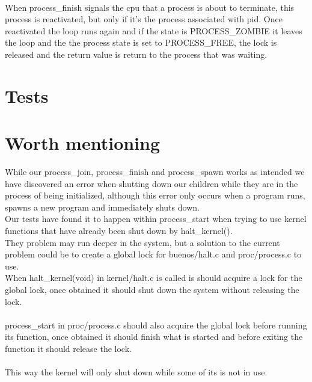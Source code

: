 \documentclass[a4paper,12pt,danish]{report}
\begin{document}
\begin{itemize}
  \\
  When process\_finish signals the cpu that a process is about to terminate, this process is reactivated, but only if it's the process associated with pid. Once reactivated the loop runs again and if the state is PROCESS\_ZOMBIE it leaves the loop and the the process state is set to PROCESS\_FREE, the lock is released and the return value is return to the process that was waiting.
\end{itemize}
\section{Tests}
\section{Worth mentioning}
While our process\_join, process\_finish and process\_spawn works as intended we have discovered an error when shutting down our children while they are in the process of being initialized, although this error only occurs when a program runs, spawns a new program and immediately shuts down.
\\
Our tests have found it to happen within process\_start when trying to use kernel functions that have already been shut down by halt\_kernel().
\\
They problem may run deeper in the system, but a solution to the current problem could be to create a global lock for buenos/halt.c and proc/process.c to use.
\\
When halt\_kernel(void) in kernel/halt.c is called is should acquire a lock for the global lock, once obtained it should shut down the system without releasing the lock.
\\
\\
process\_start in proc/process.c should also acquire the global lock before running its function, once obtained it should finish what is started and before exiting the function it should release the lock.
\\
\\
This way the kernel will only shut down while some of its  is not in use.
\end{document}
